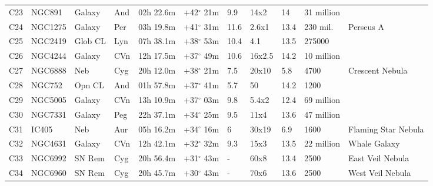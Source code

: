 \documentclass[10pt,twoside,a4paper,english]{article}
\begin{document}
\begin{longtable}{@{}lllllllllll@{}}
C23        & NGC891      & Galaxy     & And       & 02h 22.6m & +42$^{\circ}$ 21m  & 9.9       & 14x2                 & 14       & 31 million          &                                 \\ 
C24        & NGC1275     & Galaxy     & Per       & 03h 19.8m & +41$^{\circ}$ 31m  & 11.6      & 2.6x1                & 13.4     & 230 mil.            & Perseus A                       \\ 
C25        & NGC2419     & Glob CL    & Lyn       & 07h 38.1m & +38$^{\circ}$ 53m  & 10.4      & 4.1                  & 13.5     & 275000              &                                 \\ 
C26        & NGC4244     & Galaxy     & CVn       & 12h 17.5m & +37$^{\circ}$ 49m  & 10.6      & 16x2.5               & 14.2     & 10 million          &                                 \\ 
C27        & NGC6888     & Neb        & Cyg       & 20h 12.0m & +38$^{\circ}$ 21m  & 7.5       & 20x10                & 5.8      & 4700                & Crescent Nebula                 \\ 
C28        & NGC752      & Opn CL     & And       & 01h 57.8m & +37$^{\circ}$ 41m  & 5.7       & 50                   & 14.2     & 1200                &                                 \\ 
C29        & NGC5005     & Galaxy     & CVn       & 13h 10.9m & +37$^{\circ}$ 03m  & 9.8       & 5.4x2                & 12.4     & 69 million          &                                 \\ 
C30        & NGC7331     & Galaxy     & Peg       & 22h 37.1m & +34$^{\circ}$ 25m  & 9.5       & 11x4                 & 13.6     & 47 million          &                                 \\ 
C31        & IC405       & Neb        & Aur       & 05h 16.2m & +34$^{\circ}$ 16m  & 6         & 30x19                & 6.9      & 1600                & Flaming Star Nebula             \\ 
C32        & NGC4631     & Galaxy     & CVn       & 12h 42.1m & +32$^{\circ}$ 32m  & 9.3       & 15x3                 & 13.5     & 22 million          & Whale Galaxy                    \\ 
C33        & NGC6992    & SN Rem     & Cyg       & 20h 56.4m & +31$^{\circ}$ 43m  & -         & 60x8                 & 13.4     & 2500                & East Veil Nebula                \\ 
C34        & NGC6960     & SN Rem     & Cyg       & 20h 45.7m & +30$^{\circ}$ 43m  & -         & 70x6                 & 13.6     & 2500                & West Veil Nebula                \\ 

\end{longtable}
\end{document}
